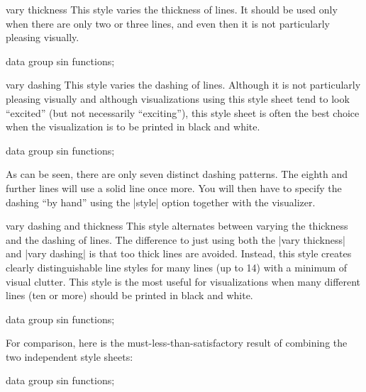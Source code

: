 \begin{stylesheet}{vary thickness}
    This style varies the thickness of lines. It should be used only when there
    are only two or three lines, and even then it is not particularly pleasing
    visually.
\begin{codeexample}[width=10cm]
\tikz \datavisualization [
  visualize as smooth line/.list=
    {1,2,3,4,5,6,7,8},
  example visualization,
  style sheet=vary thickness]
data group {sin functions};
\end{codeexample}
\end{stylesheet}

\begin{stylesheet}{vary dashing}
    This style varies the dashing of lines. Although it is not particularly
    pleasing visually and although visualizations using this style sheet tend
    to look ``excited'' (but not necessarily ``exciting''), this style sheet is
    often the best choice when the visualization is to be printed in black and
    white.
\begin{codeexample}[width=10cm]
\tikz \datavisualization [
  visualize as smooth line/.list=
    {1,2,3,4,5,6,7,8},
  example visualization,
  style sheet=vary dashing]
data group {sin functions};
\end{codeexample}
    As can be seen, there are only seven distinct dashing patterns. The eighth
    and further lines will use a solid line once more. You will then have to
    specify the dashing ``by hand'' using the |style| option together with the
    visualizer.
\end{stylesheet}

\begin{stylesheet}{vary dashing and thickness}
    This style alternates between varying the thickness and the dashing of
    lines. The difference to just using both the |vary thickness| and
    |vary dashing| is that too thick lines are avoided. Instead, this style
    creates clearly distinguishable line styles for many lines (up to 14) with
    a minimum of visual clutter. This style is the most useful for
    visualizations when many different lines (ten or more) should be printed in
    black and white.
\begin{codeexample}[width=10cm]
\tikz \datavisualization [
  visualize as smooth line/.list=
    {1,2,3,4,5,6,7,8},
  example visualization,
  style sheet=vary thickness
              and dashing]
data group {sin functions};
\end{codeexample}
    For comparison, here is the must-less-than-satisfactory result of combining
    the two independent style sheets:
\begin{codeexample}[width=10cm]
\tikz \datavisualization [
  visualize as smooth line/.list=
    {1,2,3,4,5,6,7,8},
  example visualization,
  style sheet=vary thickness,
  style sheet=vary dashing]
data group {sin functions};
\end{codeexample}
\end{stylesheet}


